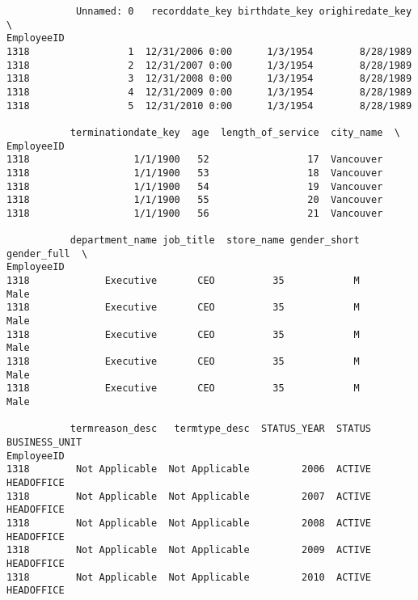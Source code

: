 \documentclass[11pt]{article}
\begin{document}
    
    \begin{verbatim}
            Unnamed: 0   recorddate_key birthdate_key orighiredate_key  \
EmployeeID                                                               
1318                 1  12/31/2006 0:00      1/3/1954        8/28/1989   
1318                 2  12/31/2007 0:00      1/3/1954        8/28/1989   
1318                 3  12/31/2008 0:00      1/3/1954        8/28/1989   
1318                 4  12/31/2009 0:00      1/3/1954        8/28/1989   
1318                 5  12/31/2010 0:00      1/3/1954        8/28/1989   

           terminationdate_key  age  length_of_service  city_name  \
EmployeeID                                                          
1318                  1/1/1900   52                 17  Vancouver   
1318                  1/1/1900   53                 18  Vancouver   
1318                  1/1/1900   54                 19  Vancouver   
1318                  1/1/1900   55                 20  Vancouver   
1318                  1/1/1900   56                 21  Vancouver   

           department_name job_title  store_name gender_short gender_full  \
EmployeeID                                                                  
1318             Executive       CEO          35            M        Male   
1318             Executive       CEO          35            M        Male   
1318             Executive       CEO          35            M        Male   
1318             Executive       CEO          35            M        Male   
1318             Executive       CEO          35            M        Male   

           termreason_desc   termtype_desc  STATUS_YEAR  STATUS BUSINESS_UNIT  
EmployeeID                                                                     
1318        Not Applicable  Not Applicable         2006  ACTIVE    HEADOFFICE  
1318        Not Applicable  Not Applicable         2007  ACTIVE    HEADOFFICE  
1318        Not Applicable  Not Applicable         2008  ACTIVE    HEADOFFICE  
1318        Not Applicable  Not Applicable         2009  ACTIVE    HEADOFFICE  
1318        Not Applicable  Not Applicable         2010  ACTIVE    HEADOFFICE  
    \end{verbatim}
\end{document}
